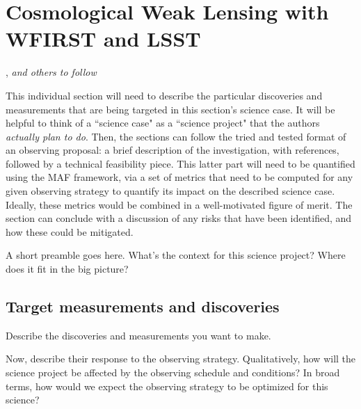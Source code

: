 %
%
%
%
%
%
%

\section{Cosmological Weak Lensing with WFIRST and LSST}
\def\secname{\chpname:weaklensing}\label{sec:\secname}

,
{\it and others to follow}

This individual section will need to describe the particular
discoveries and measurements that are being targeted in this section's
science case. It will be helpful to think of a ``science case" as a
``science project" that the authors {\it actually plan to do}. Then,
the sections can follow the tried and tested format of an observing
proposal: a brief description of the investigation, with references,
followed by a technical feasibility piece. This latter part will need
to be quantified using the MAF framework, via a set of metrics that
need to be computed for any given observing strategy to quantify its
impact on the described science case. Ideally, these metrics would be
combined in a well-motivated figure of merit. The section can conclude
with a discussion of any risks that have been identified, and how
these could be mitigated.

A short preamble goes here. What's the context for this science
project? Where does it fit in the big picture?



\subsection{Target measurements and discoveries}
\label{sec:\secname:targets}

Describe the discoveries and measurements you want to make.

Now, describe their response to the observing strategy. Qualitatively,
how will the science project be affected by the observing schedule and
conditions? In broad terms, how would we expect the observing strategy
to be optimized for this science?


